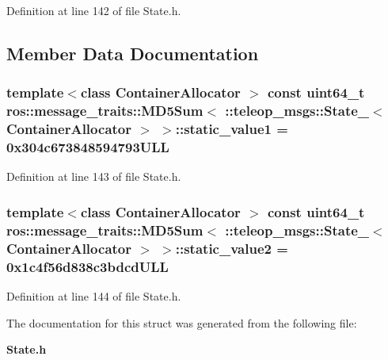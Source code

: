 Definition at line 142 of file State.h.



\subsection{Member Data Documentation}
\subsubsection[{static\_\-value1}]{\setlength{\rightskip}{0pt plus 5cm}template$<$class ContainerAllocator $>$ const uint64\_\-t ros::message\_\-traits::MD5Sum$<$ ::{\bf teleop\_\-msgs::State\_\-}$<$ ContainerAllocator $>$ $>$::{\bf static\_\-value1} = 0x304c673848594793ULL\hspace{0.3cm}{\ttfamily  [static]}}\label{structros_1_1message__traits_1_1MD5Sum_3_01_1_1teleop__msgs_1_1State___3_01ContainerAllocator_01_4_01_4_ac2b7f8ed64b76e198b358d65545379c0}


Definition at line 143 of file State.h.

\subsubsection[{static\_\-value2}]{\setlength{\rightskip}{0pt plus 5cm}template$<$class ContainerAllocator $>$ const uint64\_\-t ros::message\_\-traits::MD5Sum$<$ ::{\bf teleop\_\-msgs::State\_\-}$<$ ContainerAllocator $>$ $>$::{\bf static\_\-value2} = 0x1c4f56d838c3bdcdULL\hspace{0.3cm}{\ttfamily  [static]}}\label{structros_1_1message__traits_1_1MD5Sum_3_01_1_1teleop__msgs_1_1State___3_01ContainerAllocator_01_4_01_4_af5fc34ef5bcc2ed79654b7a1582b039f}


Definition at line 144 of file State.h.



The documentation for this struct was generated from the following file:\begin{DoxyCompactItemize}
\item 
{\bf State.h}\end{DoxyCompactItemize}
